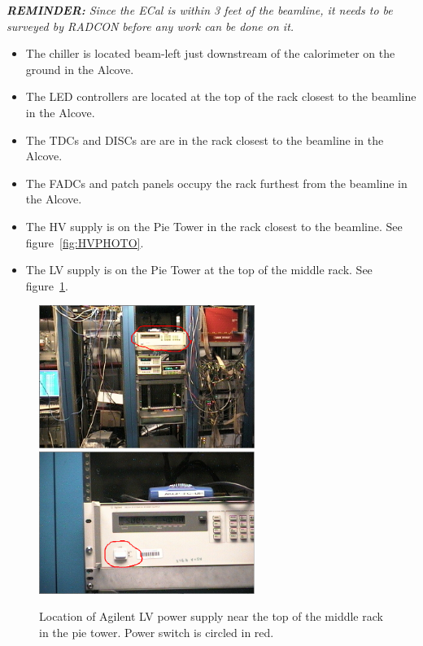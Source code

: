 \documentclass[12pt]{article}
\begin{document}
   {\em{\bf REMINDER:} Since the ECal is within 3 feet of the beamline, it needs to be surveyed by RADCON before any work can be done on it.}
   {\footnotesize
\begin{itemize}
\item
The chiller is located beam-left just downstream of the calorimeter on the ground in the Alcove.
\item
The LED controllers are located at the top of the rack closest to the beamline in the Alcove.
\item
The TDCs and DISCs are are in the rack closest to the beamline in the Alcove.
\item
The FADCs and patch panels occupy the rack furthest from the beamline in the Alcove.
\item
    The HV supply is on the Pie Tower in the rack closest to the beamline.  See figure~\ref{fig:HVPHOTO}.
\item
    The LV supply is on the Pie Tower at the top of the middle rack. See figure~\ref{fig:LVPHOTO}.
\end{itemize}
}
\begin{figure}[htbp]\centering
    \includegraphics[width=7cm]{pics/ECALLVPHOTO2.png}
    \includegraphics[width=7cm]{pics/ECALLVPHOTO.png}
    \caption{Location of Agilent LV power supply near the top of the middle rack in the pie tower.  Power switch is circled in red.\label{fig:LVPHOTO}}
\end{figure}
\end{document}
